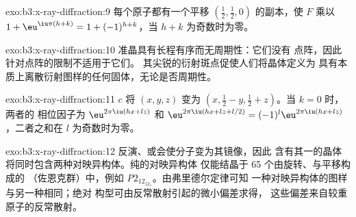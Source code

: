 \begin{solution}{exo:b3:x-ray-diffraction:9}
每个原子都有一个平移 $(\frac12,\frac12,0)$ 的副本，使 $F$ 乘以 $1 +
\eu^{\iu\pi(h+k)} = 1 + (-1)^{h+k}$，当 $h + k$ 为奇数时为零。
\end{solution}

\begin{solution}{exo:b3:x-ray-diffraction:10}
准晶具有长程有序而无周期性：它们没有
点阵，因此针对点阵的限制不适用于它们。
其尖锐的衍射斑点促使人们将晶体定义为
具有本质上离散衍射图样的任何固体，无论是否周期性。
\end{solution}

\begin{solution}{exo:b3:x-ray-diffraction:11}
$c$ 将 $(x, y, z)$ 变为 $(x, \frac12 - y, \frac12 + z)$。当 $k = 0$ 时，两者的
相位因子为 $\eu^{2\pi\iu(hx + lz)}$ 和 $\eu^{2\pi\iu(hx + lz + l/2)} = (-1)^l
\eu^{2\pi\iu(hx+lz)}$，二者之和在 $l$ 为奇数时为零。
\end{solution}

\begin{solution}{exo:b3:x-ray-diffraction:12}
反演、或会使分子变为其镜像，因此
含有其一的晶体将同时包含两种对映异构体。纯的对映异构体
仅能结晶于 65 个由旋转、与平移构成的
（佐恩克群）中，例如 \textit{P}$2_12_12_1$。由弗里德尔定律可知
一种对映异构体的图样与另一种相同；绝对
构型可由反常散射引起的微小偏差求得，
这些偏差来自较重原子的反常散射。
\end{solution}

